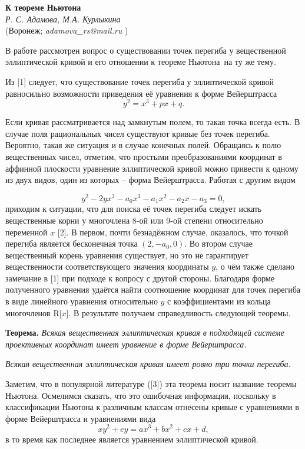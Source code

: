 
\begin{center}{ \bf  К \glqq теореме Ньютона\grqq}\\
	{\it Р. С. Адамова, М.А. Курлыкина } \\
	(Воронеж; {\it adamova\_rs@mail.ru} )
\end{center}


В работе рассмотрен вопрос о существовании точек перегиба у вещественной эллиптической кривой и его отношении к \glqq теореме Ньютона\grqq \, на ту же тему.

Из [1] следует, что существование точек перегиба у эллиптической кривой равносильно возможности приведения её уравнения к форме Вейерштрасса
$$y^2=x^3+px+q.$$

Если кривая рассматривается над замкнутым полем, то такая точка всегда есть. В случае поля рациональных чисел существуют кривые без точек перегиба. Вероятно, такая же ситуация и в случае конечных полей. Обращаясь к полю вещественных чисел, отметим, что простыми преобразованиями координат в аффинной плоскости уравнение эллиптической кривой можно привести к одному из двух видов, один из которых -- форма Вейерштрасса. Работая с другим видом

$$y^2-2yx^2-a_0x^3-a_1x^2-a_2x-a_3=0,$$
приходим к ситуации, что для поиска её точек перегиба следует искать вещественные корни у многочлена 8-ой или 9-ой степени относительно переменной  $x$ [2]. В первом, почти безнадёжном случае, оказалось, что точкой перегиба является бесконечная точка $(2, - a_0, 0).$ Во втором случае вещественный корень уравнения существует, но это не гарантирует вещественности соответствующего значения координаты $y$, о чём также сделано замечание в [1] при подходе к вопросу с другой стороны. Благодаря форме полученного уравнения удаётся найти соотношение координат для точек перегиба в виде линейного уравнения относительно $y$ с коэффициентами из кольца многочленов R[$x$]. В результате получаем справедливость следующей теоремы.

\textbf{Теорема.} {\it Всякая вещественная эллиптическая кривая в подходящей системе проективных координат имеет уравнение в форме Вейерштрасса.}

 {\it Всякая вещественная эллиптическая кривая имеет ровно три точки перегиба.}

Заметим, что в популярной литературе ([3]) эта теорема носит название теоремы Ньютона. Осмелимся сказать, что это ошибочная информация, поскольку в классификации Ньютона к различным классам отнесены кривые с уравнениями в форме Вейерштрасса и уравнениями вида
$$xy^2+ey=ax^3+bx^2+cx+d,$$
в то время как последнее является уравнением эллиптической кривой.



